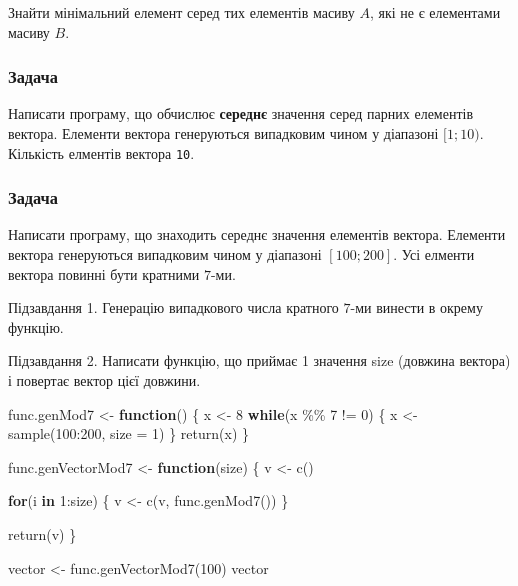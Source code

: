 \documentclass[
]{book}
\newenvironment{Shaded}{\begin{snugshade}}{\end{snugshade}}
\newcommand{\AttributeTok}[1]{\textcolor[rgb]{0.77,0.63,0.00}{#1}}
\newcommand{\ControlFlowTok}[1]{\textcolor[rgb]{0.13,0.29,0.53}{\textbf{#1}}}
\newcommand{\DecValTok}[1]{\textcolor[rgb]{0.00,0.00,0.81}{#1}}
\newcommand{\FunctionTok}[1]{\textcolor[rgb]{0.00,0.00,0.00}{#1}}
\newcommand{\NormalTok}[1]{#1}
\newcommand{\OtherTok}[1]{\textcolor[rgb]{0.56,0.35,0.01}{#1}}
\newcommand{\SpecialCharTok}[1]{\textcolor[rgb]{0.00,0.00,0.00}{#1}}
\begin{document}
Знайти мінімальний елемент серед тих елементів масиву \(A\), які не є елементами масиву \(B\).

\hypertarget{task6119}{%
\subsubsection{Задача}\label{task6119}}

Написати програму, що обчислює \textbf{середнє} значення серед парних елементів вектора. Елементи вектора генеруються випадковим чином у діапазоні \([1; 10)\). Кількість елментів вектора \texttt{10}.

\hypertarget{task6120}{%
\subsubsection{Задача}\label{task6120}}

Написати програму, що знаходить середнє значення елементів вектора. Елементи вектора генеруються випадковим чином у діапазоні \([100; 200]\). Усі елменти вектора повинні бути кратними \(7\)-ми.

Підзавдання 1. Генерацію випадкового числа кратного \(7\)-ми винести в окрему функцію.

Підзавдання 2. Написати функцію, що приймає 1 значення size (довжина вектора) і повертає вектор цієї довжини.

\begin{Shaded}
\begin{Highlighting}[]
\NormalTok{func.genMod7 }\OtherTok{\textless{}{-}} \ControlFlowTok{function}\NormalTok{() \{}
\NormalTok{  x }\OtherTok{\textless{}{-}} \DecValTok{8}
  \ControlFlowTok{while}\NormalTok{(x }\SpecialCharTok{\%\%} \DecValTok{7} \SpecialCharTok{!=} \DecValTok{0}\NormalTok{) \{}
\NormalTok{    x }\OtherTok{\textless{}{-}} \FunctionTok{sample}\NormalTok{(}\DecValTok{100}\SpecialCharTok{:}\DecValTok{200}\NormalTok{, }\AttributeTok{size =} \DecValTok{1}\NormalTok{)}
\NormalTok{  \}}
  \FunctionTok{return}\NormalTok{(x)}
\NormalTok{\}}

\NormalTok{func.genVectorMod7 }\OtherTok{\textless{}{-}} \ControlFlowTok{function}\NormalTok{(size) \{}
\NormalTok{  v }\OtherTok{\textless{}{-}} \FunctionTok{c}\NormalTok{()}
  
  \ControlFlowTok{for}\NormalTok{(i }\ControlFlowTok{in} \DecValTok{1}\SpecialCharTok{:}\NormalTok{size) \{}
\NormalTok{    v }\OtherTok{\textless{}{-}} \FunctionTok{c}\NormalTok{(v, }\FunctionTok{func.genMod7}\NormalTok{())}
\NormalTok{  \}}
  
  \FunctionTok{return}\NormalTok{(v)}
\NormalTok{\}}

\NormalTok{vector }\OtherTok{\textless{}{-}} \FunctionTok{func.genVectorMod7}\NormalTok{(}\DecValTok{100}\NormalTok{)}
\NormalTok{vector}
\end{Highlighting}
\end{Shaded}
\end{document}

